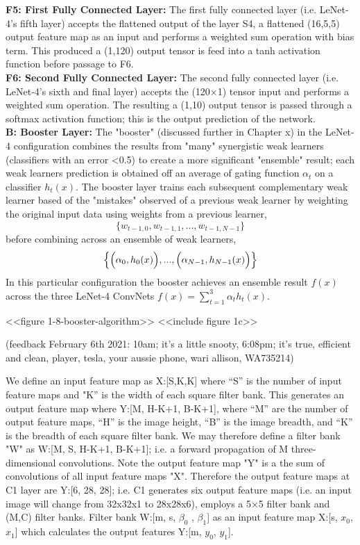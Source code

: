 \documentclass[7pt]{article}
\begin{document}
\textbf{F5: First Fully Connected Layer:} The first fully connected layer (i.e. LeNet-4’s fifth layer) accepts the flattened output of the layer S4, a flattened (16,5,5) output feature map as an input and performs a weighted sum operation with bias term. This produced a (1,120) output tensor is feed into a tanh activation function before passage to F6. \\

\textbf{F6: Second Fully Connected Layer:} The second fully connected layer (i.e. LeNet-4’s sixth and final layer) accepts the (120×1) tensor input and performs a weighted sum operation. The resulting a (1,10) output tensor is passed through a softmax activation function; this is the output prediction  of the network. \\

\textbf{B: Booster Layer:} The "booster" (discussed further in Chapter x) in the LeNet-4 configuration combines the results from "many" synergistic weak learners (classifiers with an error <0.5) to create a more significant "ensemble" result; each weak learners prediction is obtained off an average of gating function $\alpha_t$ on a classifier $h_t(x)$. The booster layer trains each subsequent complementary weak learner based of the "mistakes" observed of a previous weak learner by weighting the original input data using weights from a previous learner,
\begin{equation}
 \Bigr\{  w_{t-1,0}, w_{t-1,1}, ...  ,w_{t-1,N-1} \Bigr\}
 \end{equation}
  before combining across an ensemble of weak learners,
  \begin{equation}
  \Bigr\{ \Bigr( \alpha_0, h_0(x) \Bigl),...,  \Bigr(  \alpha_{N-1}, h_{N-1}(x) \Bigl)  \Bigr\}
  \end{equation}
   In this particular configuration the booster achieves an ensemble result $f(x)$ across the three LeNet-4 ConvNets
 	$f(x) = \sum_{t=1}^{3} \alpha_t h_t (x)$.
 	
 
 <<figure 1-8-booster-algorithm>>
 	<<include figure 1c>>
 	


\newpage
(feedback February 6th 2021: 10am; it's a little snooty, 6:08pm; it's true, efficient and clean, player, tesla, your aussie phone, wari allison, WA735214)

We define an input feature map as X:[S,K,K] where “S” is the number of input feature maps and "K” is the width of each square filter bank. This generates an output feature map where Y:[M, H-K+1, B-K+1], where “M” are the number of output feature maps, “H” is the image height, “B” is the  image breadth, and “K” is the breadth of each square filter bank. We may therefore define a filter bank "W" as W:[M, S, H-K+1, B-K+1]; i.e. a forward propagation of M three-dimensional convolutions. Note the output feature map "Y" is a the sum of convolutions of all input feature maps "X". Therefore the output feature maps at C1 layer are Y:[6, 28, 28]; i.e. C1 generates six output feature maps (i.e. an input image will change from 32x32x1 to 28x28x6), employs a 5×5 filter bank and (M,C) filter banks. Filter bank W:[m, s, $\beta_0$ , $\beta_1$] as an input feature map X:[s, $x_0$, $x_1$] which calculates the output features Y:[m, $y_0$, $y_1$]. 
\end{document}
